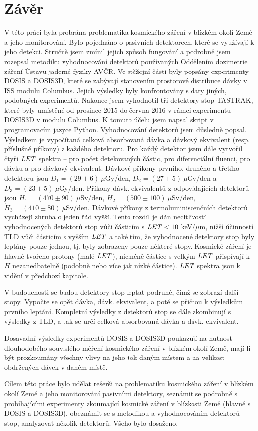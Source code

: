 \chapter*{Závěr}
V této práci byla probrána problematika kosmického záření v blízkém okolí Země a jeho monitorování. Bylo pojednáno o pasivních detektorech, které se využívají k jeho detekci. Stručně jsem zmínil jejich způsob fungování a podrobně jsem rozepsal metodiku vyhodnocování detektorů používaných Oddělením dozimetrie záření Ústavu jaderné fyziky AVČR. Ve stěžejní části byly popsány experimenty DOSIS a DOSIS3D, které se zabývají stanovením prostorové distribuce dávky v ISS modulu Columbus. Jejich výsledky byly konfrontovány s daty jiných, podobných experimentů. Nakonec jsem vyhodnotil tři detektory stop TASTRAK, které byly umístěné od prosince 2015 do června 2016 v rámci experimentu DOSIS3D v modulu Columbus. K tomuto účelu jsem napsal skript v programovacím jazyce Python.
Vyhodnocování detektorů jsem důsledně popsal. Výsledkem je vypočítaná celková absorbovaná dávka a dávkový ekvivalent (resp. příslušné příkony) z každého detektoru. Pro každý detektor
jsem dále vytvořil čtyři $\mathit{LET}$ spektra -- pro počet detekovaných částic, pro diferenciální fluenci, pro dávku a pro dávkový ekvivalent. Dávkové příkony prvního, druhého a třetího detektoru jsou $\dot{D}_1=(29\pm6)\ \mu$Gy/den, $\dot{D}_2=(27\pm5)\ \mu$Gy/den a $\dot{D}_3=(23\pm5)\ \mu$Gy/den. Příkony dávk. ekvivalentů z odpovídajících detektorů jsou $\dot{H}_1=(470\pm90)\ \mu$Sv/den, $\dot{H}_2=(500\pm100)\ \mu$Sv/den, $\dot{H}_3=(410\pm80)\ \mu$Sv/den. Dávkové příkony z termoluminiscenčních detektorů vycházejí zhruba o jeden řád vyšší. Tento rozdíl je dán necitlivostí vyhodnocených detektorů stop vůči částicím s $\mathit{LET}<10$ keV/$\mu$m, nižší účinností TLD vůči částicím s vyšším $\mathit{LET}$ a také tím, že vyhodnocené detektory stop byly leptány pouze jednou, tj. byly zobrazeny pouze některé stopy. Kosmické záření je
hlavně tvořeno protony (malé $\mathit{LET}$), nicméně částice s velkým $\mathit{LET}$ přispívají k $H$ nezanedbatelně (podobně nebo více jak nízké částice). $\mathit{LET}$ spektra jsou k vidění v předchozí kapitole.

V budoucnosti se budou detektory stop leptat podruhé, čímž se zobrazí další stopy. Vypočte se opět dávka, dávk. ekvivalent, a poté se přičtou k výsledkům prvního leptání. Kompletní výsledky z detektorů stop se dále zkombinují s výsledky z TLD, a tak se určí celková absorbovaná dávka a dávk. ekvivalent. 

Dosavadní výsledky experimentů DOSIS a DOSIS3D poukazují na nutnost dlouhodobého souvislého měření kosmického záření v blízkém okolí Země, mají-li být prozkoumány všechny vlivy na jeho tok daným místem a na velikost obdržených dávek v daném místě.

Cílem této práce bylo udělat rešerši na problematiku kosmického záření v blízkém okolí Země a jeho monitorování pasivními detektory, seznámit se podrobně s probíhajícími experimenty zkoumající kosmické záření v blízkosti Země (hlavně s DOSIS a DOSIS3D), obeznámit se s metodikou a vyhodnocováním detektorů stop, analyzovat několik detektorů. Všeho bylo dosaženo. 
